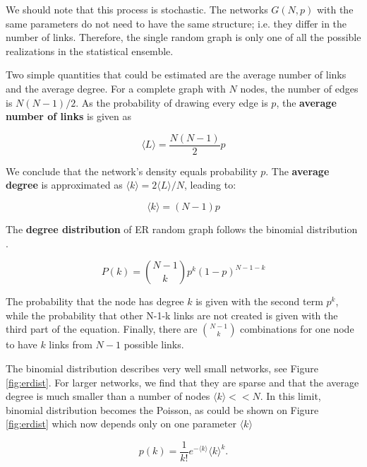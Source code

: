 We should note that this process is stochastic. The networks $G(N, p)$ with the same parameters do not need to have the same structure; i.e. they differ in the number of links. Therefore, the single random graph is only one of all the possible realizations in the statistical ensemble. 

Two simple quantities that could be estimated are the average number of links and the average degree. For a complete graph with $N$ nodes, the number of edges is $N(N-1)/2$. As the probability of drawing every edge is $p$, the \textbf{average number of links} is given as 

\begin{equation}
\langle L \rangle = \frac{N(N-1)}{2}p
\end{equation}

We conclude that the network's density equals probability $p$.
The \textbf{average degree} is approximated as $\langle k \rangle = 2 \langle L \rangle / N $, leading to:

\begin{equation}
\langle k \rangle = (N-1)p 
\end{equation}

The \textbf{degree distribution} of ER random graph follows the binomial distribution \cite{barabasi2016network}. 

\begin{equation}
P(k) = \binom{N-1}{k}p^k(1-p)^{N-1-k}
\end{equation}

The probability that the node has degree $k$ is given with the second term $p^k$, while the probability that other N-1-k links are not created is given with the third part of the equation. Finally, there are  $\binom{N-1}{k}$ combinations for one node to have $k$ links from $N-1$ possible links. 

The binomial distribution describes very well small networks, see Figure \ref{fig:erdist}. For larger networks, we find that they are sparse and that the average degree is much smaller than a number of nodes $\langle k \rangle << N$. In this limit, binomial distribution becomes the Poisson, as could be shown on Figure \ref{fig:erdist} which now depends only on one parameter $\langle k \rangle$


\begin{equation}
p(k) = \frac{1}{k!}e^{-\langle k \rangle}\langle k \rangle^{k}.
\end{equation}

